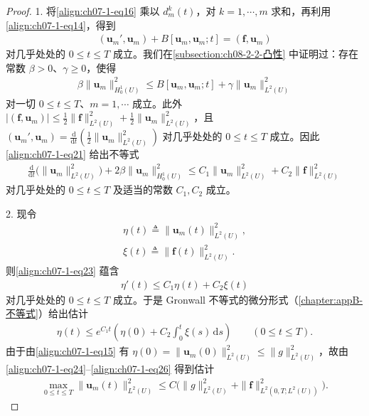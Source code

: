 \documentclass[../../main.tex]{subfiles}
\begin{document}
\begin{proof}
1. 将\eqref{align:ch07-1-eq16} 乘以 $d_m^k(t)$，对 $k=1,\cdots,m$ 求和，再利用\eqref{align:ch07-1-eq14}，得到
\begin{align}
(\mathbf{u}_m',\mathbf{u}_m) + B[\mathbf{u}_m,\mathbf{u}_m;t] = (\mathbf{f},\mathbf{u}_m)\label{align:ch07-1-eq21}
\end{align}
对几乎处处的 $0\leqslant t\leqslant T$ 成立。我们在\cref{subsection:ch08-2-2-凸性} 中证明过：存在常数 $\beta>0$、$\gamma\geqslant 0$，使得
\begin{align}
\beta\|\mathbf{u}_m\|_{H^1_0(U)}^2 \leqslant B[\mathbf{u}_m,\mathbf{u}_m;t] + \gamma\|\mathbf{u}_m\|_{L^2(U)}^2\label{align:ch07-1-eq22}
\end{align}
对一切 $0\leqslant t\leqslant T$、$m=1,\cdots$ 成立。此外 $|(\mathbf{f},\mathbf{u}_m)|\leqslant \frac12\|\mathbf{f}\|_{L^2(U)}^2+\frac12\|\mathbf{u}_m\|_{L^2(U)}^2$，且 $(\mathbf{u}_m',\mathbf{u}_m)=\frac{\mathrm{d}}{\mathrm{d}t}\left(\frac12\|\mathbf{u}_m\|_{L^2(U)}^2\right)$ 对几乎处处的 $0\leqslant t\leqslant T$ 成立。因此\eqref{align:ch07-1-eq21} 给出不等式
\begin{align}
\frac{\mathrm{d}}{\mathrm{d}t}\bigl(\|\mathbf{u}_m\|_{L^2(U)}^2\bigr) + 2\beta\|\mathbf{u}_m\|_{H^1_0(U)}^2 \leqslant C_1\|\mathbf{u}_m\|_{L^2(U)}^2 + C_2\|\mathbf{f}\|_{L^2(U)}^2\label{align:ch07-1-eq23}
\end{align}
对几乎处处的 $0\leqslant t\leqslant T$ 及适当的常数 $C_1,C_2$ 成立。

2. 现令
\begin{align}
\eta(t)\triangleq \|\mathbf{u}_m(t)\|_{L^2(U)}^2,\label{align:ch07-1-eq24}\\
\xi(t)\triangleq \|\mathbf{f}(t)\|_{L^2(U)}^2.\label{align:ch07-1-eq25}
\end{align}
则\eqref{align:ch07-1-eq23} 蕴含
\begin{align*}
\eta'(t) \leqslant C_1\eta(t)+C_2\xi(t)
\end{align*}
对几乎处处的 $0\leqslant t\leqslant T$ 成立。于是 Gronwall 不等式的微分形式（\cref{chapter:appB-不等式}）给出估计
\begin{align}
\eta(t) \leqslant e^{C_1 t}\left(\eta(0)+C_2\int_0^t \xi(s)\,\mathrm{d}s\right)\qquad (0\leqslant t\leqslant T).\label{align:ch07-1-eq26}
\end{align}
由于由\eqref{align:ch07-1-eq15} 有 $\eta(0)=\|\mathbf{u}_m(0)\|_{L^2(U)}^2\leqslant\|g\|_{L^2(U)}^2$，故由\eqref{align:ch07-1-eq24}--\eqref{align:ch07-1-eq26} 得到估计
\begin{align*}
\max_{0\leqslant t\leqslant T}\|\mathbf{u}_m(t)\|_{L^2(U)}^2 \leqslant C\bigl(\|g\|_{L^2(U)}^2+\|\mathbf{f}\|_{L^2(0,T;L^2(U))}^2\bigr).
\end{align*}


\end{proof}
\end{document}
